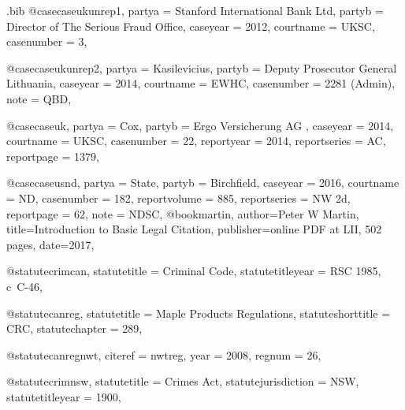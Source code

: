\begin{filecontents*}[overwrite]{\jobname.bib}
@case{caseukunrep1,
  partya = {Stanford International Bank Ltd}, 
  partyb = {Director of The Serious Fraud Office},
  caseyear = {2012},
  courtname = {UKSC},
  casenumber = {3},
	}

@case{caseukunrep2,
  partya = {Kasilevicius}, 
  partyb = {Deputy Prosecutor General Lithuania},
  caseyear = {2014},
  courtname = {EWHC},
  casenumber = {2281 (Admin)},
	note = {QBD},
	}



@case{caseuk,
  partya = {Cox}, 
  partyb = {Ergo Versicherung AG },
  caseyear = {2014},
  courtname = {UKSC},
  casenumber = {22},
  reportyear = {2014},
  reportseries = {AC},
  reportpage = {1379},
	}



@case{caseusnd,
  partya = {State}, 
  partyb = {Birchfield},
  caseyear = {2016},
  courtname = {ND},
  casenumber = {182},
  reportvolume = {885},
  reportseries = {NW 2d},
  reportpage = {62},
  note = {NDSC},
	}
@book{martin,
author={Peter W Martin},
title={Introduction to Basic Legal Citation},
publisher={online PDF at LII, 502 pages},
date={2017},
}


@statute{crimcan,
statutetitle = {Criminal Code},
statutetitleyear = {RSC 1985, c~C-46},%
}


@statute{canreg,
statutetitle = {Maple Products Regulations},
statuteshorttitle = {CRC},
statutechapter = {289},
}

@statute{canregnwt,
citeref = {nwtreg},
year = {2008},
regnum = {26},
}


@statute{crimnsw,
statutetitle = {Crimes Act},
statutejurisdiction = {NSW},
statutetitleyear = {1900},%
}


\end{filecontents*}
